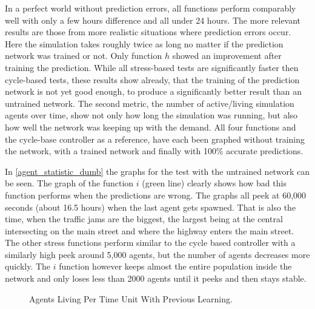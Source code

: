 In a perfect world without prediction errors, all functions perform comparably well with only a few hours difference and all under 24 hours. The more relevant results are those from more realistic situations where prediction errors occur. Here the simulation takes roughly twice as long no matter if the prediction network was trained or not. Only function $h$ showed an improvement after training the prediction. While all stress-based tests are significantly faster then cycle-based tests, these results show already, that the training of the prediction network is not yet good enough, to produce a significantly better result than an untrained network.
The second metric, the number of active/living simulation agents over time, show not only how long the simulation was running, but also how well the network was keeping up with the demand. All four functions and the cycle-base controller as a reference, have each been graphed without training the network, with a trained network and finally with 100\% accurate predictions.

In \autoref{agent_statistic_dumb} the graphs for the test with the untrained network can be seen. The graph of the function $i$ (green line) clearly shows how bad this function performs when the predictions are wrong. The graphs all peek at 60,000 seconds (about 16.5 hours) when the last agent gets spawned. That is also the time, when the traffic jams are the biggest, the largest being at the central intersecting on the main street and where the highway enters the main street. The other stress functions perform similar to the cycle based controller with a similarly high peek around 5,000 agents, but the number of agents decreases more quickly. The $i$ function however keeps almost the entire population inside the network and only loses less than 2000 agents until it peeks and then stays stable.

\begin{figure}[ht!]
	\centering
	\caption{Agents Living Per Time Unit With Previous Learning.}
	\label{agent_statistic_learned}
\end{figure}

